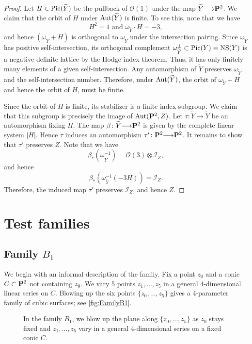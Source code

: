 \documentclass[12pt,reqno]{amsart}
\renewcommand{\to}{{\longrightarrow}}
\numberwithin{equation}{section}
\renewcommand{\O}{\mathcal O}
\begin{document}
\begin{proof}
  Let $H \in \Pic(\widetilde Y)$ be the pullback of $\O(1)$ under the map $\widetilde Y \to \P^2$.
  We claim that the orbit of $H$ under $\Aut(\widetilde Y)$ is finite.
  To see this, note that we have
  \[ H^2 = 1 \text{ and } \omega_{\widetilde Y} \cdot H = -3, \]
  and hence $(\omega_{\widetilde Y} + H)$ is orthogonal to $\omega_{\widetilde Y}$ under the intersection pairing.
  Since $\omega_{\widetilde Y}$ has positive self-intersection, its orthogonal complement $\omega_{\widetilde Y}^\perp \subset \Pic(Y) = {\rm NS}(Y)$ is a negative definite lattice by the Hodge index theorem.
  Thus, it has only finitely many elements of a given self-intersection.
  Any automorphism of $\widetilde Y$ preserves $\omega_{\widetilde Y}$ and the self-intersection number.
  Therefore, under $\Aut(\widetilde Y)$, the orbit of $\omega_{\widetilde Y} + H$ and hence the orbit of $H$, must be finite.

  Since the orbit of $H$ is finite, its stabilizer is a finite index subgroup.
  We claim that this subgroup is precisely the image of $\Aut(\P^2, Z)$.
  Let $\tau \colon \widetilde Y \to \widetilde Y$ be an automorphism fixing $H$.
  The map $\beta \colon \widetilde Y \to \P^2$ is given by the complete linear system $|H|$.
  Hence $\tau$ induces an automorphism $\tau' \colon \P^2 \to \P^2$.
  It remains to show that $\tau'$ preserves $Z$.
  Note that we have
  \[ \beta_* \left(\omega_{\widetilde Y}^{-1}\right) = \O(3) \otimes \mathcal I_Z,\]
  and hence
  \[ \beta_* \left( \omega_{\widetilde Y}^{-1} (-3H) \right) = \mathcal I_Z.\]
  Therefore, the induced map $\tau'$ preserves $\mathcal I_Z$, and hence $Z$.
\end{proof}



\section{Test families}\label{sec:testfamilies}
\subsection{Family $B_1$}
\label{sec:first-test-family}
We begin with an informal description of the family.
Fix a point $z_0$ and a conic $C \subset \P^2$ not containing $z_0$.
We vary 5 points $z_1, \dots, z_5$ in a general 4-dimensional linear series on $C$.
Blowing up the six points $\{z_0, \dots, z_5\}$ gives a 4-parameter family of cubic surfaces; see \autoref{fig:FamilyB1}.
\begin{figure}
  \centering
  
  \caption{In the family $B_1$, we blow up the plane along $\{z_0, \dots, z_5\}$ as $z_0$ stays fixed and $z_1,\dots,z_5$ vary in a general 4-dimensional series on a fixed conic $C$.}
  \label{fig:FamilyB1}
\end{figure}
\end{document}
